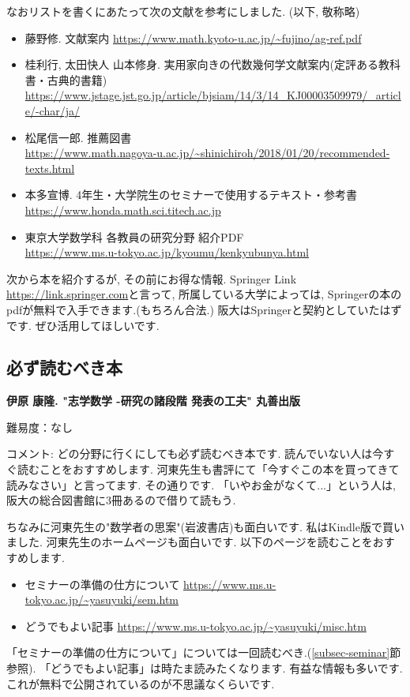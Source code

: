 なおリストを書くにあたって次の文献を参考にしました. (以下, 敬称略)
\vspace{-8pt}
\begin{itemize}[left=0pt]
  \setlength{\parskip}{0cm} %
  \setlength{\itemsep}{4pt} %
\item 藤野修. 文献案内 \url{https://www.math.kyoto-u.ac.jp/~fujino/ag-ref.pdf}
\item 桂利行, 太田快人 山本修身. 実用家向きの代数幾何学文献案内(定評ある教科書・古典的書籍) \url{https://www.jstage.jst.go.jp/article/bjsiam/14/3/14_KJ00003509979/_article/-char/ja/}
\item 松尾信一郎. 推薦図書 \\ \url{https://www.math.nagoya-u.ac.jp/~shinichiroh/2018/01/20/recommended-texts.html}
\item 本多宣博. 4年生・大学院生のセミナーで使用するテキスト・参考書 \\ \url{https://www.honda.math.sci.titech.ac.jp}
\item 東京大学数学科 各教員の研究分野 紹介PDF \\ \url{https://www.ms.u-tokyo.ac.jp/kyoumu/kenkyubunya.html}
\end{itemize}


次から本を紹介するが, その前にお得な情報. 
Springer Link \url{https://link.springer.com}と言って, 所属している大学によっては, Springerの本のpdfが無料で入手できます.(もちろん合法.) 阪大はSpringerと契約としていたはずです. ぜひ活用してほしいです. 

\subsection{必ず読むべき本}

\textbf{伊原 康隆. "志学数学 -研究の諸段階 発表の工夫" 丸善出版} \vspace{-6pt}

難易度：なし \vspace{-6pt}

コメント: どの分野に行くにしても必ず読むべき本です. 読んでいない人は今すぐ読むことをおすすめします. 
河東先生も書評にて「今すぐこの本を買ってきて読みなさい」と言ってます. その通りです. 
「いやお金がなくて...」という人は, 阪大の総合図書館に3冊あるので借りて読もう. 

ちなみに河東先生の"数学者の思案"(岩波書店)も面白いです. 私はKindle版で買いました.
河東先生のホームページも面白いです. 以下のページを読むことをおすすめします. 
\begin{itemize}[left=0pt]
  \setlength{\parskip}{0cm} %
  \setlength{\itemsep}{0cm} %
\item セミナーの準備の仕方について \url{https://www.ms.u-tokyo.ac.jp/~yasuyuki/sem.htm}
\item どうでもよい記事 \url{https://www.ms.u-tokyo.ac.jp/~yasuyuki/misc.htm}
\end{itemize}
「セミナーの準備の仕方について」については一回読むべき.(\ref{subsec-seminar}節参照).  
「どうでもよい記事」は時たま読みたくなります. 有益な情報も多いです. これが無料で公開されているのが不思議なくらいです. 

